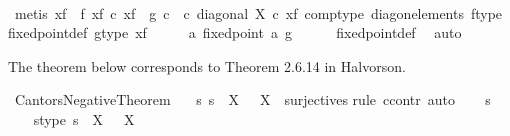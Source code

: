 \begin{isabellebody}
\ \ \ \ \isamarkupfalse%
\ {\isacharparenleft}{\kern0pt}metis\ {\isacartoucheopen}{\isasymphi}\isactrlbsub {\isacharbrackleft}{\kern0pt}{\isacharminus}{\kern0pt}{\isacharcomma}{\kern0pt}x{\isacharunderscore}{\kern0pt}f{\isacharbrackright}{\kern0pt}\isactrlesub \ {\isacharequal}{\kern0pt}\ f{\isacartoucheclose}\ {\isacartoucheopen}{\isasymphi}\isactrlbsub {\isacharbrackleft}{\kern0pt}{\isacharminus}{\kern0pt}{\isacharcomma}{\kern0pt}x{\isacharunderscore}{\kern0pt}f{\isacharbrackright}{\kern0pt}\isactrlesub \ {\isasymcirc}\isactrlsub c\ x{\isacharunderscore}{\kern0pt}f\ {\isacharequal}{\kern0pt}\ g\ {\isasymcirc}\isactrlsub c\ {\isasymphi}\ {\isasymcirc}\isactrlsub c\ diagonal\ X\ {\isasymcirc}\isactrlsub c\ x{\isacharunderscore}{\kern0pt}f{\isacartoucheclose}\ comp{\isacharunderscore}{\kern0pt}type\ diag{\isacharunderscore}{\kern0pt}on{\isacharunderscore}{\kern0pt}elements\ f{\isacharunderscore}{\kern0pt}type\ fixed{\isacharunderscore}{\kern0pt}point{\isacharunderscore}{\kern0pt}def{}\ g{\isacharunderscore}{\kern0pt}type\ x{\isacharunderscore}{\kern0pt}f{\isacharparenright}{\kern0pt}\isanewline
\ \ \isamarkupfalse%
\ \isamarkupfalse%
\ {\isachardoublequoteopen}{\isasymexists}a{\isachardot}{\kern0pt}\ fixed{\isacharunderscore}{\kern0pt}point\ a\ g{\isachardoublequoteclose}\isanewline
\ \ \ \ \isamarkupfalse%
\ fixed{\isacharunderscore}{\kern0pt}point{\isacharunderscore}{\kern0pt}def\ \isamarkupfalse%
\ auto\isanewline
{}\isamarkupfalse%
%
\endisatagproof
{\isafoldproof}%
%
\isadelimproof
%
\endisadelimproof
%
\begin{isamarkuptext}%
The theorem below corresponds to Theorem 2.6.14 in Halvorson.%
\end{isamarkuptext}\isamarkuptrue%
\isamarkupfalse%
\ Cantors{\isacharunderscore}{\kern0pt}Negative{\isacharunderscore}{\kern0pt}Theorem{\isacharcolon}{\kern0pt}\isanewline
\ \ {\isachardoublequoteopen}{\isasymnexists}\ s{\isachardot}{\kern0pt}\ s\ {\isacharcolon}{\kern0pt}\ X\ {\isasymrightarrow}\ {\isasymP}\ X\ {\isasymand}\ surjective{\isacharparenleft}{\kern0pt}s{\isacharparenright}{\kern0pt}{\isachardoublequoteclose}\isanewline
%
\isadelimproof
%
\endisadelimproof
%
\isatagproof
{}\isamarkupfalse%
{\isacharparenleft}{\kern0pt}rule\ ccontr{\isacharcomma}{\kern0pt}\ auto{\isacharparenright}{\kern0pt}\isanewline
\ \ \isamarkupfalse%
\ s\ \isanewline
\ \ \isamarkupfalse%
\ s{\isacharunderscore}{\kern0pt}type{\isacharcolon}{\kern0pt}\ {\isachardoublequoteopen}s\ {\isacharcolon}{\kern0pt}\ X\ {\isasymrightarrow}\ {\isasymP}\ X{\isachardoublequoteclose}\isanewline

\end{isabellebody}
